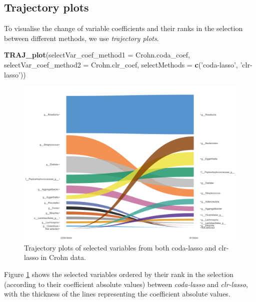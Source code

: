 \documentclass[openany]{book}
\newenvironment{Shaded}{\begin{snugshade}}{\end{snugshade}}
\newcommand{\KeywordTok}[1]{\textcolor[rgb]{0.13,0.29,0.53}{\textbf{#1}}}
\newcommand{\DataTypeTok}[1]{\textcolor[rgb]{0.13,0.29,0.53}{#1}}
\newcommand{\StringTok}[1]{\textcolor[rgb]{0.31,0.60,0.02}{#1}}
\newcommand{\NormalTok}[1]{#1}
\begin{document}
\subsection{Trajectory plots}\label{trajectory-plots}

To visualise the change of variable coefficients and their ranks in the
selection between different methods, we use \emph{trajectory plots}.

\begin{Shaded}
\begin{Highlighting}[]
\KeywordTok{TRAJ_plot}\NormalTok{(}\DataTypeTok{selectVar_coef_method1 =}\NormalTok{ Crohn.coda_coef, }
          \DataTypeTok{selectVar_coef_method2 =}\NormalTok{ Crohn.clr_coef, }
          \DataTypeTok{selectMethods =} \KeywordTok{c}\NormalTok{(}\StringTok{'coda-lasso'}\NormalTok{, }\StringTok{'clr-lasso'}\NormalTok{))}
\end{Highlighting}
\end{Shaded}

\begin{figure}

{\centering \includegraphics[width=1\linewidth]{./Generated_plots/trajCD-1} 

}

\caption{Trajectory plots of selected variables from both coda-lasso and clr-lasso in Crohn data.}\label{fig:trajCD}
\end{figure}

Figure \ref{fig:trajCD} shows the selected variables ordered by their
rank in the selection (according to their coefficient absolute values)
between \emph{coda-lasso} and \emph{clr-lasso}, with the thickness of
the lines representing the coefficient absolute values.
\end{document}
